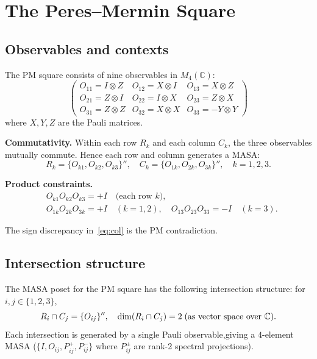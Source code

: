 \documentclass[11pt]{article}
\begin{document}
\section{The Peres--Mermin Square}
\label{sec:PM}

\subsection{Observables and contexts}

The PM square consists of nine observables in $M_4(\mathbb{C})$:
\[
\begin{pmatrix}
  O_{11} = I{\otimes}Z & O_{12} = X{\otimes}I & O_{13} = X{\otimes}Z \\[4pt]
  O_{21} = Z{\otimes}I & O_{22} = I{\otimes}X & O_{23} = Z{\otimes}X \\[4pt]
  O_{31} = Z{\otimes}Z & O_{32} = X{\otimes}X & O_{33} = {-Y{\otimes}Y}
\end{pmatrix}
\]
where $X, Y, Z$ are the Pauli matrices.

\textbf{Commutativity.} Within each row $R_k$ and each column $C_k$,
the three observables mutually commute. Hence each row and column
generates a MASA:
\[
  R_k = \{O_{k1}, O_{k2}, O_{k3}\}'',\quad
  C_k = \{O_{1k}, O_{2k}, O_{3k}\}'', \quad k = 1, 2, 3.
\]

\textbf{Product constraints.}
\begin{align}
  &O_{k1} O_{k2} O_{k3} = +I \quad\text{(each row } k\text{)}, \label{eq:row}\\
  &O_{1k} O_{2k} O_{3k} = +I \quad (k=1,2),\quad
   O_{13} O_{23} O_{33} = -I \quad (k=3). \label{eq:col}
\end{align}

The sign discrepancy in~\eqref{eq:col} is the PM contradiction.

\subsection{Intersection structure}

The MASA poset for the PM square has the following intersection
structure: for $i, j \in \{1,2,3\}$,
\[
  R_i \cap C_j = \{O_{ij}\}'', \quad \dim(R_i \cap C_j) = 2
  \;\text{(as vector space over }\mathbb{C}\text{)}.\linebreak
\]
Each intersection is generated by a single Pauli observable,\linebreak giving a $4$-element MASA ($\{I, O_{ij}, P_{ij}^+, P_{ij}^-\}$ where $P_{ij}^\pm$ are rank-2 spectral projections).
\end{document}
